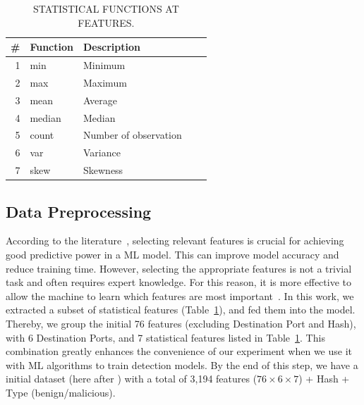\begin{table}[ht]
  \caption{STATISTICAL FUNCTIONS AT FEATURES.}
  \centering
  \begin{small}
    \begin{tabular}{rllrr}   \hline
 \# & Function & Description\\ \hline

1 &  min &  Minimum\\ 
  2 &  max & Maximum\\ 
  
  3 &  mean & Average\\ 
  
  4 &  median & Median\\ 
  5 &  count & Number of observation\\ 
  6 &  var & Variance\\ 
  7 &  skew & Skewness \\ 
   \hline

 \end{tabular}
 \end{small}
 \label{tab:function}
 \end{table}

\subsection{Data Preprocessing}\label{sec:set}


According to the literature~\cite{DBLP:conf/ichmi/Xie22,DBLP:journals/mta/AmiriebrahimabadiM24}, selecting relevant features is crucial for achieving good predictive power in a ML model. This can improve model accuracy and reduce training time. However, selecting the appropriate features is not a trivial task and often requires expert knowledge. For this reason, it is more effective to allow the machine to learn which features are most important~\cite{DBLP:journals/spe/FallahB22}. In this work, we extracted a subset of statistical features (Table~\ref{tab:function}), and fed them into the model. Thereby, we group the initial 76 features (excluding Destination Port and Hash), with 6 Destination Ports, and 7 statistical features listed in Table~\ref{tab:function}. This combination greatly enhances the convenience of our experiment when we use it with ML algorithms to train detection models. By the end of this step, we have a initial dataset (here after \fds) with a total of 3,194 features ($76\times6\times7$) + Hash + Type (benign/malicious).


